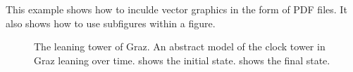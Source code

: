 This example shows how to inculde vector graphics in the form of PDF
files. It also shows how to use subfigures within a figure.


\begin{figure}[tp]
\centering
{}
\hfill
{}

\caption[Abstract Clock Towers]
{
The leaning tower of Graz. An abstract model of the clock
tower in Graz leaning over time.  shows
the initial state.  shows the final state.
}
\label{figWholeFig}
\end{figure}



